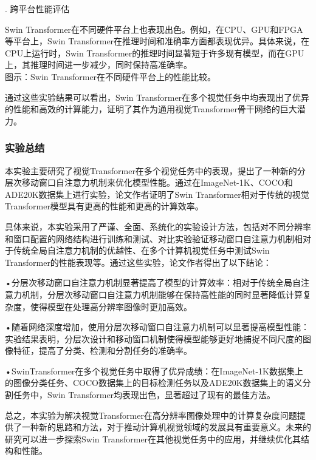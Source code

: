 \documentclass{article}
\begin{document}
. 跨平台性能评估

Swin Transformer在不同硬件平台上也表现出色。例如，在CPU、GPU和FPGA等平台上，Swin Transformer在推理时间和准确率方面都表现优异。具体来说，在CPU上运行时，Swin Transformer的推理时间显著短于许多现有模型，而在GPU上，其推理时间进一步减少，同时保持高准确率。\\
图示：Swin Transformer在不同硬件平台上的性能比较。

通过这些实验结果可以看出，Swin Transformer在多个视觉任务中均表现出了优异的性能和高效的计算能力，证明了其作为通用视觉Transformer骨干网络的巨大潜力。

\subsubsection{实验总结}
本实验主要研究了视觉Transformer在多个视觉任务中的表现，提出了一种新的分层次移动窗口自注意力机制来优化模型性能。通过在ImageNet-1K、COCO和ADE20K数据集上进行实验，论文作者证明了Swin Transformer相对于传统的视觉Transformer模型具有更高的性能和更高的计算效率。

具体来说，本实验采用了严谨、全面、系统化的实验设计方法，包括对不同分辨率和窗口配置的网络结构进行训练和测试、对比实验验证移动窗口自注意力机制相对于传统全局自注意力机制的优越性、在多个计算机视觉任务中测试Swin Transformer的性能表现等。通过这些实验，论文作者得出了以下结论：

•分层次移动窗口自注意力机制显著提高了模型的计算效率：相对于传统全局自注意力机制，分层次移动窗口自注意力机制能够在保持高性能的同时显著降低计算复杂度，使得模型在处理高分辨率图像时更加高效。

•随着网络深度增加，使用分层次移动窗口自注意力机制可以显著提高模型性能：实验结果表明，分层次设计和移动窗口机制使得模型能够更好地捕捉不同尺度的图像特征，提高了分类、检测和分割任务的准确率。

•SwinTransformer在多个视觉任务中取得了优异成绩：在ImageNet-1K数据集上的图像分类任务、COCO数据集上的目标检测任务以及ADE20K数据集上的语义分割任务中，Swin Transformer均表现出色，显著超过了现有的最佳方法。

总之，本实验为解决视觉Transformer在高分辨率图像处理中的计算复杂度问题提供了一种新的思路和方法，对于推动计算机视觉领域的发展具有重要意义。未来的研究可以进一步探索Swin Transformer在其他视觉任务中的应用，并继续优化其结构和性能。
\end{document}
